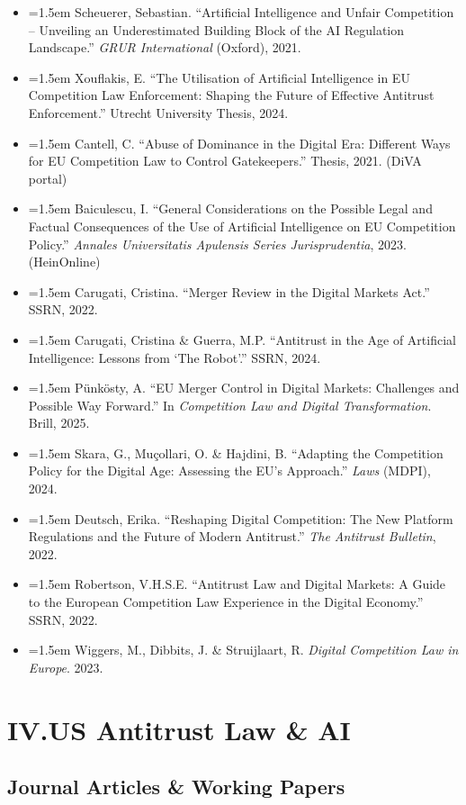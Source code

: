 \documentclass[12pt, letterpaper]{article}
\newcommand{\entry}[1]{%
  \item \hangindent=1.5em \hangafter=1 #1%
}
\begin{document}
\begin{itemize}
\entry{Scheuerer, Sebastian. ``Artificial Intelligence and Unfair Competition -- Unveiling an Underestimated Building Block of the AI Regulation Landscape.'' \textit{GRUR International} (Oxford), 2021.}
\entry{Xouflakis, E. ``The Utilisation of Artificial Intelligence in EU Competition Law Enforcement: Shaping the Future of Effective Antitrust Enforcement.'' Utrecht University Thesis, 2024.}
\entry{Cantell, C. ``Abuse of Dominance in the Digital Era: Different Ways for EU Competition Law to Control Gatekeepers.'' Thesis, 2021. (DiVA portal)}
\entry{Baiculescu, I. ``General Considerations on the Possible Legal and Factual Consequences of the Use of Artificial Intelligence on EU Competition Policy.'' \textit{Annales Universitatis Apulensis Series Jurisprudentia}, 2023. (HeinOnline)}
\entry{Carugati, Cristina. ``Merger Review in the Digital Markets Act.'' SSRN, 2022.}
\entry{Carugati, Cristina \& Guerra, M.P. ``Antitrust in the Age of Artificial Intelligence: Lessons from `The Robot'.'' SSRN, 2024.}
\entry{Pünkösty, A. ``EU Merger Control in Digital Markets: Challenges and Possible Way Forward.'' In \textit{Competition Law and Digital Transformation}. Brill, 2025.}
\entry{Skara, G., Muçollari, O. \& Hajdini, B. ``Adapting the Competition Policy for the Digital Age: Assessing the EU's Approach.'' \textit{Laws} (MDPI), 2024.}
\entry{Deutsch, Erika. ``Reshaping Digital Competition: The New Platform Regulations and the Future of Modern Antitrust.'' \textit{The Antitrust Bulletin}, 2022.}
\entry{Robertson, V.H.S.E. ``Antitrust Law and Digital Markets: A Guide to the European Competition Law Experience in the Digital Economy.'' SSRN, 2022.}
\entry{Wiggers, M., Dibbits, J. \& Struijlaart, R. \textit{Digital Competition Law in Europe}. 2023.}
\end{itemize}

\section{IV.\quad US Antitrust Law \& AI}

\subsection{Journal Articles \& Working Papers}
\end{document}
